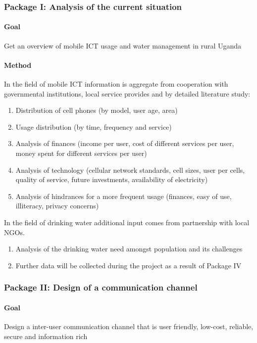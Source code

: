 \documentclass[11pt]{article}
\begin{document}
\subsubsection*{Package I: Analysis of the current situation}
\paragraph{Goal} Get an overview of mobile ICT usage and water management in rural Uganda
\paragraph{Method}
In the field of mobile ICT information is aggregate from cooperation with governmental institutions, local service provides and by detailed literature study:
\begin{enumerate}
 \item Distribution of cell phones (by model, user age, area)
 \item Usage distribution (by time, frequency and service)
 \item Analysis of finances (income per user, cost of different services per user, money spent for different services per user)
 \item Analysis of technology (cellular network standards, cell sizes, user per cells, quality of service, future investments, availability of electricity)
 \item Analysis of hindrances for a more frequent usage (finances, easy of use, illiteracy, privacy concerns)
\end{enumerate}
In the field of drinking water additional input comes from partnership with local NGOs.
\begin{enumerate}
 \item Analysis of the drinking water need amongst population and its challenges
 \item Further data will be collected during the project as a result of Package IV
\end{enumerate}







\subsubsection*{Package II: Design of a communication channel}
\paragraph{Goal} Design a inter-user communication channel that is user friendly, low-cost, reliable, secure and information rich
\end{document}
